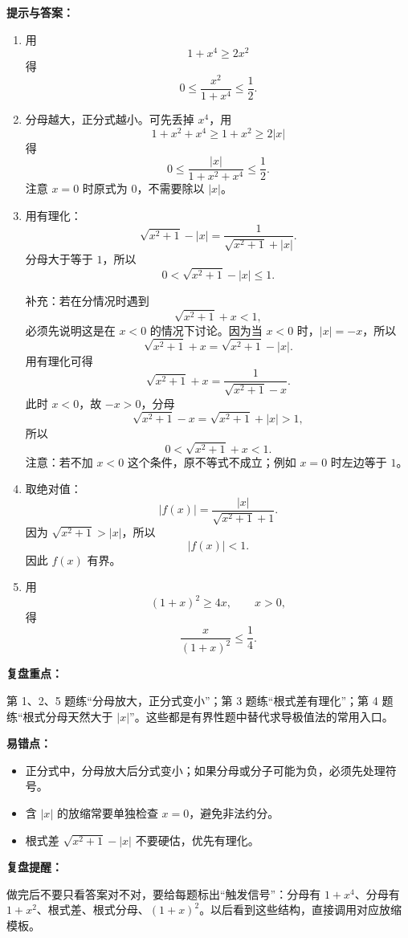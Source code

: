 \begin{solutionBox}
\textbf{提示与答案：}

\begin{enumerate}
  \item 用
  \[
  1+x^4\ge 2x^2
  \]
  得
  \[
  0\le \frac{x^2}{1+x^4}\le \frac12.
  \]

  \item 分母越大，正分式越小。可先丢掉 \(x^4\)，用
  \[
  1+x^2+x^4\ge 1+x^2\ge 2|x|
  \]
  得
  \[
  0\le \frac{|x|}{1+x^2+x^4}\le \frac12.
  \]
  注意 \(x=0\) 时原式为 \(0\)，不需要除以 \(|x|\)。

  \item 用有理化：
  \[
  \sqrt{x^2+1}-|x|
  =\frac{1}{\sqrt{x^2+1}+|x|}.
  \]
  分母大于等于 \(1\)，所以
  \[
  0<\sqrt{x^2+1}-|x|\le 1.
  \]

  补充：若在分情况时遇到
  \[
  \sqrt{x^2+1}+x<1,
  \]
  必须先说明这是在 \(x<0\) 的情况下讨论。因为当 \(x<0\) 时，\(|x|=-x\)，所以
  \[
  \sqrt{x^2+1}+x=\sqrt{x^2+1}-|x|.
  \]
  用有理化可得
  \[
  \sqrt{x^2+1}+x
  =\frac{1}{\sqrt{x^2+1}-x}.
  \]
  此时 \(x<0\)，故 \(-x>0\)，分母
  \[
  \sqrt{x^2+1}-x=\sqrt{x^2+1}+|x|>1,
  \]
  所以
  \[
  0<\sqrt{x^2+1}+x<1.
  \]
  注意：若不加 \(x<0\) 这个条件，原不等式不成立；例如 \(x=0\) 时左边等于 \(1\)。

  \item 取绝对值：
  \[
  |f(x)|=\frac{|x|}{\sqrt{x^2+1}+1}.
  \]
  因为 \(\sqrt{x^2+1}>|x|\)，所以
  \[
  |f(x)|<1.
  \]
  因此 \(f(x)\) 有界。

  \item 用
  \[
  (1+x)^2\ge 4x,\qquad x>0,
  \]
  得
  \[
  \frac{x}{(1+x)^2}\le \frac14.
  \]
\end{enumerate}

\textbf{复盘重点：}

第 1、2、5 题练“分母放大，正分式变小”；第 3 题练“根式差有理化”；第 4 题练“根式分母天然大于 \(|x|\)”。这些都是有界性题中替代求导极值法的常用入口。
\end{solutionBox}

\begin{mistakeBox}
\textbf{易错点：}

\begin{itemize}
  \item 正分式中，分母放大后分式变小；如果分母或分子可能为负，必须先处理符号。
  \item 含 \(|x|\) 的放缩常要单独检查 \(x=0\)，避免非法约分。
  \item 根式差 \(\sqrt{x^2+1}-|x|\) 不要硬估，优先有理化。
\end{itemize}

\textbf{复盘提醒：}

做完后不要只看答案对不对，要给每题标出“触发信号”：分母有 \(1+x^4\)、分母有 \(1+x^2\)、根式差、根式分母、\((1+x)^2\)。以后看到这些结构，直接调用对应放缩模板。
\end{mistakeBox}

